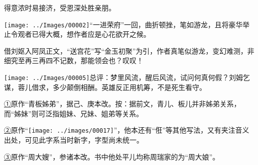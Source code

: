得意浓时易接济，受恩深处胜亲朋。

{\texttt{[image: ../Images/00002]}``一进荣府''一回，曲折顿挫，笔如游龙，且将豪华举止令观者已得大概，想作者应是心花欲开之候。}

{借刘妪入阿凤正文，``送宫花''写``金玉初聚''为引，作者真笔似游龙，变幻难测，非细究至再三再四不记数，那能领会也？叹叹！}

{\texttt{[image: ../Images/00005]}总评：梦里风流，醒后风流，试问何真何假？刘姆乞谋，蓉儿借求，多少颠倒相酬。英雄反正用机筹，不是死生看守。}

{\href{../Text/part0010_split_000.html\#navto_1_a}{①}原作``青板姊弟''，据己、庚本改。按：据前文，青儿、板儿并非姊弟关系，而``姊妹''则可泛指姐妹、兄妹、姐弟等关系。}

{\href{../Text/part0010_split_000.html\#navto_2_a}{②}原作``\texttt{[image: ../images/00017]}''，他本还有``俇''等其他写法，又有夹注音义出处，可见此字系当时新字，字型尚未统一。}

{\href{../Text/part0010_split_000.html\#navto_3_a}{③}原作``周大嫂''，参诸本改。书中他处平儿均称周瑞家的为``周大娘''。}
